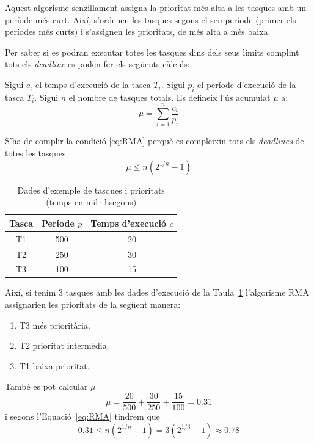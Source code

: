 Aquest algorisme senzillament assigna la prioritat més alta a les tasques amb un període més curt. Així, s'ordenen les tasques segons el seu període (primer els períodes més curts) i s'assignen les prioritats, de més alta a més baixa.

Per saber si es podran executar totes les tasques dins dels seus límits complint tots els {\em deadline} es poden fer els següents càlculs:

Sigui $c_i$ el temps d'execució de la tasca $T_i$. Sigui $p_i$ el període d'execució de la tasca $T_i$. Sigui $n$ el nombre de tasques totals.
Es defineix l'ús acumulat $\mu$ a:
\begin{equation*}
 \mu = \sum^{n}_{i=1}\frac{c_i}{p_i}
\end{equation*}

S'ha de complir la condició \ref{eq:RMA} perquè es compleixin tots els {\em deadlines} de totes les tasques.
\begin{equation}
\label{eq:RMA}
 \mu \leq n (2^{1/n}-1)
\end{equation}

\begin{table}[b]
\caption{Dades d'exemple de tasques i prioritats (temps en mil·lisegons)}
\label{tb:RMA_example}
\centering
\begin{tabular}{|c|c|c|}
\hline
{\bf Tasca} & {\bf Període $p$} & {\bf Temps d'execució $c$}\\
\hline
T1 & 500 & 20\\
\hline
T2 & 250 & 30\\
\hline
T3 & 100 & 15\\
\hline
\end{tabular}
\end{table}

Així, si tenim 3 tasques amb les dades d'execució de la Taula~\ref{tb:RMA_example} l'algorisme RMA assignarien les prioritats de la següent manera:

\begin{enumerate}
 \item T3 més prioritària.
 \item T2 prioritat intermèdia.
 \item T1 baixa prioritat.
\end{enumerate}

També es pot calcular $\mu$
\begin{equation*}
 \mu = \frac{20}{500} + \frac{30}{250} + \frac{15}{100} = 0.31
\end{equation*}
i segons l'Equació~\ref{eq:RMA} tindrem que
\begin{equation*}
 0.31 \leq n (2^{1/n}-1) = 3(2^{1/3}-1) \approx 0.78
\end{equation*}

